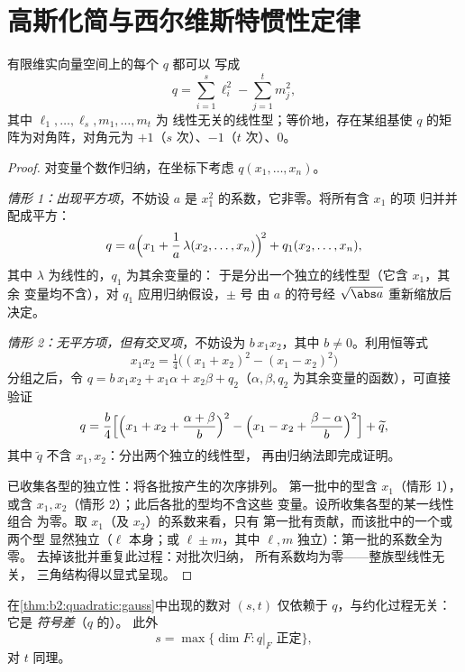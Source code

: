 \section{高斯化简与西尔维斯特惯性定律}

\begin{theorem}[高斯化简]\label{thm:b2:quadratic:gauss}
有限维实向量空间上的每个 $q$ 都可以
写成
\[
q = \sum_{i=1}^{s} \ell_i^2 - \sum_{j=1}^{t} m_j^2 ,
\]
其中 $\ell_1, \dots, \ell_s, m_1, \dots, m_t$ 为
线性无关的线性型；等价地，存在某组基使
$q$ 的矩阵为对角阵，对角元为 $+1$（$s$ 次）、$-1$（$t$
次）、$0$。
\end{theorem}

\begin{proof}
对变量个数作归纳，在坐标下考虑 $q(x_1,
\dots, x_n)$。

\emph{情形 1：出现平方项}，不妨设 $a$ 是
$x_1^2$ 的系数，它非零。将所有含 $x_1$ 的项
归并并配成平方：
\[
q = a\Bigl(x_1 + \frac{1}{a}\,\lambda(x_2, \dots,
x_n)\Bigr)^{\!2} + q_1(x_2, \dots, x_n),
\]
其中 $\lambda$ 为线性的，$q_1$ 为其余变量的：
于是分出一个独立的线性型（它含 $x_1$，其余
变量均不含），对 $q_1$ 应用归纳假设，$\pm$ 号
由 $a$ 的符号经 $\sqrt{\abs a}$ 重新缩放后决定。

\emph{情形 2：无平方项，但有交叉项}，不妨设为 $b\,x_1x_2$，其中
$b \neq 0$。利用恒等式
\[
x_1x_2 = \tfrac14\bigl((x_1 + x_2)^2 - (x_1 - x_2)^2\bigr)
\]
分组之后，令 $q = b\,x_1x_2 + x_1\alpha + x_2\beta +
q_2$（$\alpha, \beta, q_2$ 为其余变量的函数），可直接验证
\[
q = \frac{b}{4}\Bigl[\Bigl(x_1 + x_2 + \frac{\alpha +
\beta}{b}\Bigr)^{2} - \Bigl(x_1 - x_2 + \frac{\beta -
\alpha}{b}\Bigr)^{2}\Bigr] + \widetilde q ,
\]
其中 $\widetilde q$ 不含 $x_1, x_2$：分出两个独立的线性型，
再由归纳法即完成证明。

已收集各型的独立性：将各批按产生的次序排列。
第一批中的型含 $x_1$（情形 1），
或含 $x_1, x_2$（情形 2）；此后各批的型均不含这些
变量。设所收集各型的某一线性组合
为零。取 $x_1$（及 $x_2$）的系数来看，只有
第一批有贡献，而该批中的一个或两个型
显然独立（$\ell$ 本身；或 $\ell \pm
m$，其中 $\ell, m$ 独立）：第一批的系数全为零。
去掉该批并重复此过程：对批次归纳，
所有系数均为零——整族型线性无关，
三角结构得以显式呈现。
\end{proof}

\begin{theorem}[西尔维斯特惯性定律]\label{thm:b2:quadratic:sylvester}
在\cref{thm:b2:quadratic:gauss}中出现的数对 $(s, t)$ 仅依赖于
$q$，与约化过程无关：它是
\emph{符号差}（$q$ 的）。
此外
\[
s = \max\{\dim F : q|_F \text{ 正定}\},
\]
对 $t$ 同理。
\end{theorem}


